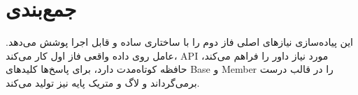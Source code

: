 \documentclass[12pt,a4paper]{article}
\begin{document}
\section{جمع‌بندی}

این پیاده‌سازی نیازهای اصلی فاز دوم را با ساختاری ساده و قابل اجرا پوشش می‌دهد. عامل روی داده واقعی فاز اول کار می‌کند، API مورد نیاز داور را فراهم می‌کند، حافظه کوتاه‌مدت دارد، برای پاسخ‌ها کلیدهای Base و Member را در قالب درست برمی‌گرداند و لاگ و متریک پایه نیز تولید می‌کند.
\end{document}
